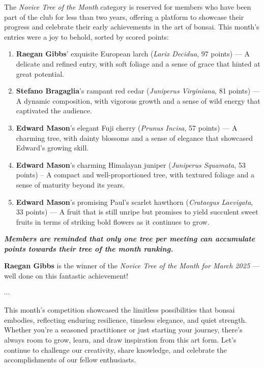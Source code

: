 \noindent 
The \textit{Novice Tree of the Month} category is reserved for members who have been part of the club for less than two years, offering a platform to showcase their progress and celebrate their early achievements in the art of bonsai.
This month's entries were a joy to behold, sorted by scored points:

\begin{enumerate}
    \item \textbf{Raegan Gibbs}' exquisite European larch (\textit{Larix Decidua}, 97 points) --- A delicate and refined entry, with soft foliage and a sense of grace that hinted at great potential.

    \item \textbf{Stefano Bragaglia}'s rampant red cedar (\textit{Juniperus Virginiana}, 81 points) --- A dynamic composition, with vigorous growth and a sense of wild energy that captivated the audience.

    \item \textbf{Edward Mason}'s elegant Fuji cherry (\textit{Prunus Incisa}, 57 points) --- A charming tree, with dainty blossoms and a sense of elegance that showcased Edward's growing skill.
    
    \item \textbf{Edward Mason}'s charming Himalayan juniper (\textit{Juniperus Squamata}, 53 points) – A compact and well\--proportioned tree, with textured foliage and a sense of maturity beyond its years. 
    
    \item \textbf{Edward Mason}'s promising Paul's scarlet hawthorn (\textit{Crataegus Laevigata}, 33 points) --- A fruit that is still unripe but promises to yield succulent sweet fruits in terms of striking bold flowers as it continues to grow.
\end{enumerate}

\noindent
\textit{\textbf{Members are reminded that only one tree per meeting can accumulate points towards their tree of the month ranking.}}

\medskip
\textbf{Raegan Gibbs} is the winner of the \textit{Novice Tree of the Month for March 2025} --- well done on this fantastic achievement!

\begin{center}
    $\cdots$
\end{center}

\noindent
This month's competition showcased the limitless possibilities that bonsai embodies, reflecting enduring resilience, timeless elegance, and quiet strength.
Whether you're a seasoned practitioner or just starting your journey, there's always room to grow, learn, and draw inspiration from this art form.
Let's continue to challenge our creativity, share knowledge, and celebrate the accomplishments of our fellow enthusiasts.

